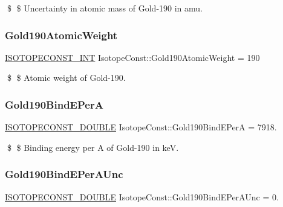 \$ \$ Uncertainty in atomic mass of Gold-\/190 in amu. \mbox{\label{group___isotope_const-_gold-_au190_gaf22c84d41c6d4d9d36871042a35142b6}} 
\subsubsection{\texorpdfstring{Gold190\+Atomic\+Weight}{Gold190AtomicWeight}}
{\footnotesize\ttfamily \mbox{\hyperlink{group___isotope_const-_macros_ga5f18360b3e99483a35c32d789e62621c}{I\+S\+O\+T\+O\+P\+E\+C\+O\+N\+S\+T\+\_\+\+I\+NT}} Isotope\+Const\+::\+Gold190\+Atomic\+Weight = 190}

\$ \$ Atomic weight of Gold-\/190. \mbox{\label{group___isotope_const-_gold-_au190_gad154be415900da8e5d3330f1ce354917}} 
\subsubsection{\texorpdfstring{Gold190\+Bind\+E\+PerA}{Gold190BindEPerA}}
{\footnotesize\ttfamily \mbox{\hyperlink{group___isotope_const-_macros_ga8f45a7272ce02c0b4c65c44636ed719a}{I\+S\+O\+T\+O\+P\+E\+C\+O\+N\+S\+T\+\_\+\+D\+O\+U\+B\+LE}} Isotope\+Const\+::\+Gold190\+Bind\+E\+PerA = 7918.}

\$ \$ Binding energy per A of Gold-\/190 in keV. \mbox{\label{group___isotope_const-_gold-_au190_gab9f6650b6e3b7011e176696f888d223c}} 
\subsubsection{\texorpdfstring{Gold190\+Bind\+E\+Per\+A\+Unc}{Gold190BindEPerAUnc}}
{\footnotesize\ttfamily \mbox{\hyperlink{group___isotope_const-_macros_ga8f45a7272ce02c0b4c65c44636ed719a}{I\+S\+O\+T\+O\+P\+E\+C\+O\+N\+S\+T\+\_\+\+D\+O\+U\+B\+LE}} Isotope\+Const\+::\+Gold190\+Bind\+E\+Per\+A\+Unc = 0.}

